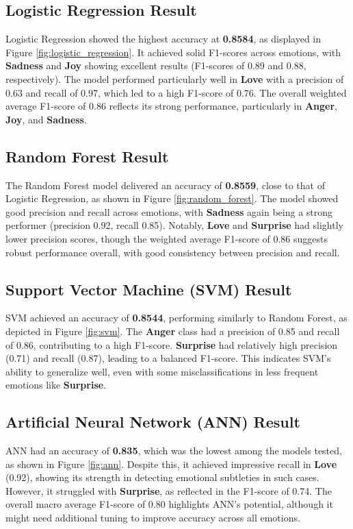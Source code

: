 \subsection{Logistic Regression Result}
Logistic Regression showed the highest accuracy at \textbf{0.8584}, as displayed in Figure \ref{fig:logistic_regression}. It achieved solid F1-scores across emotions, with \textbf{Sadness} and \textbf{Joy} showing excellent results (F1-scores of 0.89 and 0.88, respectively). The model performed particularly well in \textbf{Love} with a precision of 0.63 and recall of 0.97, which led to a high F1-score of 0.76. The overall weighted average F1-score of 0.86 reflects its strong performance, particularly in \textbf{Anger}, \textbf{Joy}, and \textbf{Sadness}.

\subsection{Random Forest Result}
The Random Forest model delivered an accuracy of \textbf{0.8559}, close to that of Logistic Regression, as shown in Figure \ref{fig:random_forest}. The model showed good precision and recall across emotions, with \textbf{Sadness} again being a strong performer (precision 0.92, recall 0.85). Notably, \textbf{Love} and \textbf{Surprise} had slightly lower precision scores, though the weighted average F1-score of 0.86 suggests robust performance overall, with good consistency between precision and recall.

\subsection{Support Vector Machine (SVM) Result}
SVM achieved an accuracy of \textbf{0.8544}, performing similarly to Random Forest, as depicted in Figure \ref{fig:svm}. The \textbf{Anger} class had a precision of 0.85 and recall of 0.86, contributing to a high F1-score. \textbf{Surprise} had relatively high precision (0.71) and recall (0.87), leading to a balanced F1-score. This indicates SVM's ability to generalize well, even with some misclassifications in less frequent emotions like \textbf{Surprise}.

\subsection{Artificial Neural Network (ANN) Result}
ANN had an accuracy of \textbf{0.835}, which was the lowest among the models tested, as shown in Figure \ref{fig:ann}. Despite this, it achieved impressive recall in \textbf{Love} (0.92), showing its strength in detecting emotional subtleties in such cases. However, it struggled with \textbf{Surprise}, as reflected in the F1-score of 0.74. The overall macro average F1-score of 0.80 highlights ANN's potential, although it might need additional tuning to improve accuracy across all emotions.

